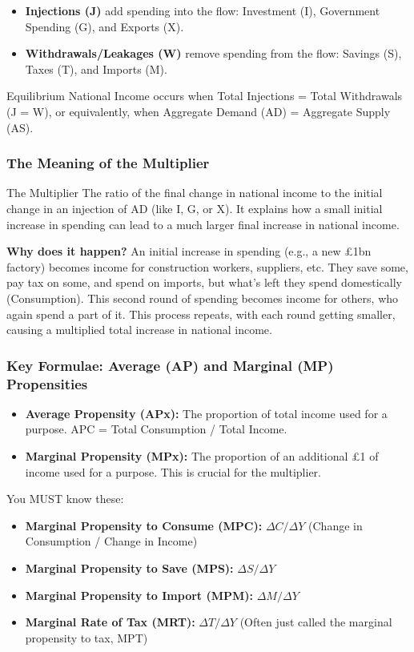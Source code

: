 \documentclass[11pt, a4paper, twoside]{book}
\begin{document}
\begin{itemize}
  \item \textbf{Injections (J)} add spending into the flow: Investment (I), Government Spending (G), and Exports (X).
  \item \textbf{Withdrawals/Leakages (W)} remove spending from the flow: Savings (S), Taxes (T), and Imports (M).
\end{itemize}

Equilibrium National Income occurs when Total Injections = Total Withdrawals (J = W), or equivalently, when Aggregate Demand (AD) = Aggregate Supply (AS).

\subsubsection{The Meaning of the Multiplier}

\begin{keyterm}{The Multiplier}
The ratio of the final change in national income to the initial change in an injection of AD (like I, G, or X). It explains how a small initial increase in spending can lead to a much larger final increase in national income.
\end{keyterm}

\textbf{Why does it happen?} An initial increase in spending (e.g., a new £1bn factory) becomes income for construction workers, suppliers, etc. They save some, pay tax on some, and spend on imports, but what's left they spend domestically (Consumption). This second round of spending becomes income for others, who again spend a part of it. This process repeats, with each round getting smaller, causing a multiplied total increase in national income.

\subsubsection{Key Formulae: Average (AP) and Marginal (MP) Propensities}

\begin{itemize}
  \item \textbf{Average Propensity (APx):} The proportion of total income used for a purpose. APC = Total Consumption / Total Income.
  \item \textbf{Marginal Propensity (MPx):} The proportion of an additional £1 of income used for a purpose. This is crucial for the multiplier.
\end{itemize}

You MUST know these:
\begin{itemize}
  \item \textbf{Marginal Propensity to Consume (MPC):} $\Delta C / \Delta Y$ (Change in Consumption / Change in Income)
  \item \textbf{Marginal Propensity to Save (MPS):} $\Delta S / \Delta Y$
  \item \textbf{Marginal Propensity to Import (MPM):} $\Delta M / \Delta Y$
  \item \textbf{Marginal Rate of Tax (MRT):} $\Delta T / \Delta Y$ (Often just called the marginal propensity to tax, MPT)
\end{itemize}
\end{document}
